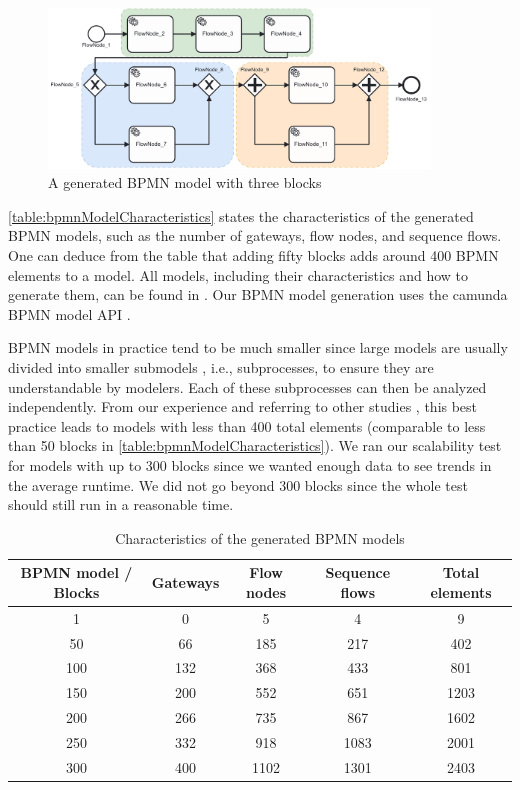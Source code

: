\documentclass{lmcs} %
\begin{document}
\begin{figure}[ht]
    \centering
    \includegraphics[width=0.9\textwidth]{images/003.pdf}
    \caption{A generated BPMN model with three blocks}
    \label{fig:threeBlockModel}
\end{figure}

\autoref{table:bpmnModelCharacteristics} states the characteristics of the generated BPMN models, such as the number of gateways, flow nodes, and sequence flows.
One can deduce from the table that adding fifty blocks adds around 400 BPMN elements to a model.
All models, including their characteristics and how to generate them, can be found in \cite{timkrauterLMCS2024Artifacts2023}.
Our BPMN model generation uses the camunda BPMN model API \cite{camundaservicesgmbhCamundaBPMNModel2023}.

BPMN models in practice tend to be much smaller since large models are usually divided into smaller submodels \cite{fahlandAnalysisDemandInstantaneous2011}, i.e., subprocesses, to ensure they are understandable by modelers.
Each of these subprocesses can then be analyzed independently.
From our experience and referring to other studies \cite{fahlandAnalysisDemandInstantaneous2011}, this best practice leads to models with less than 400 total elements (comparable to less than 50 blocks in \autoref{table:bpmnModelCharacteristics}).
We ran our scalability test for models with up to 300 blocks since we wanted enough data to see trends in the average runtime.
We did not go beyond 300 blocks since the whole test should still run in a reasonable time. 


\begin{table}[ht]
\centering
\caption{Characteristics of the generated BPMN models}
\begin{tabular}{| c | c | c | c || c |}
 \hline
 BPMN model / Blocks & Gateways & Flow nodes & Sequence flows & Total elements \\
 \hline\hline
 1 & 0 & 5 & 4 & 9 \\
 \hline
 50 & 66 & 185 & 217 & 402 \\
 \hline
 100 & 132 & 368 & 433 & 801 \\
 \hline
 150 & 200 & 552 & 651 & 1203 \\
 \hline
 200 & 266 & 735 & 867 & 1602 \\
 \hline
 250 & 332 & 918 & 1083 & 2001 \\
 \hline
 300 & 400 & 1102 & 1301 & 2403 \\
 \hline
\end{tabular}
\label{table:bpmnModelCharacteristics}
\end{table}
\end{document}
